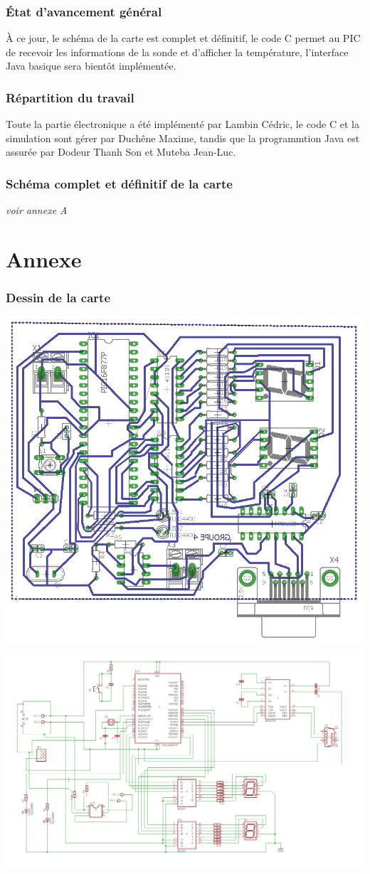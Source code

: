 \documentclass[12pt]{article}
\begin{document}
\section{État d'avancement général}
	À ce jour, le schéma de la carte est complet et définitif, le code C permet au PIC de recevoir les informations de la sonde et
	d'afficher la température, l'interface Java basique sera bientôt implémentée.

\section{Répartition du travail}
	Toute la partie électronique a été implémenté par Lambin Cédric, le code C et la simulation sont gérer par Duchêne Maxime, 
	tandis que la programmtion Java est assurée par Dodeur Thanh Son et Muteba Jean-Luc.
	
\section{Schéma complet et définitif de la carte}
	\textit{voir annexe A}

\appendix
\newpage

\part*{Annexe}

\section{Dessin de la carte}
	\includegraphics[scale=0.4]{17360818_804944499659683_173090360_n.png}
    \newpage
	\includegraphics[scale=0.7]{17310461_804699796350820_1466488599_o.png}
\end{document}
